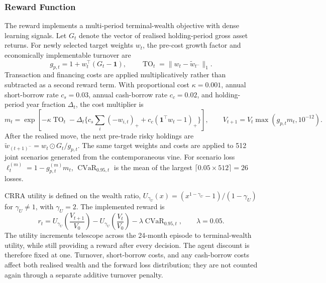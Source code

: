 \subsubsection{Reward Function}
\label{subsubsec:3_reward_function}

The reward implements a multi-period terminal-wealth objective with dense learning signals. Let $G_t$ denote the vector of realised holding-period gross asset returns. For newly selected target weights $w_t$, the pre-cost growth factor and economically implementable turnover are
%
\begin{equation}
g_{p,t}=1+w_t^{\top}(G_t-\mathbf{1}),
\qquad \operatorname{TO}_t=\lVert w_t-\widetilde w_{t^-}\rVert_1.
\label{eq:portfolio_return}
\end{equation}
%
Transaction and financing costs are applied multiplicatively rather than subtracted as a second reward term. With proportional cost $\kappa=0.001$, annual short-borrow rate $c_s=0.03$, annual cash-borrow rate $c_c=0.02$, and holding-period year fraction $\Delta_t$, the cost multiplier is
%
\begin{equation}
m_t=\exp\left[-\kappa\operatorname{TO}_t-\Delta_t\{c_s\sum_i(-w_{i,t})_+ + c_c(\mathbf{1}^{\top}w_t-1)_+\}\right],
\qquad V_{t+1}=V_t\max(g_{p,t}m_t,10^{-12}).
\label{eq:cost_adjusted_wealth}
\end{equation}
%
After the realised move, the next pre-trade risky holdings are $\widetilde w_{(t+1)^-}=w_t\odot G_t/g_{p,t}$. The same target weights and costs are applied to 512 joint scenarios generated from the contemporaneous vine. For scenario loss $\ell_t^{(m)}=1-g_{p,t}^{(m)}m_t$, $\operatorname{CVaR}_{0.95,t}$ is the mean of the largest $\lceil0.05\times512\rceil=26$ losses.

CRRA utility is defined on the wealth ratio, $U_{\gamma_U}(x)=(x^{1-\gamma_U}-1)/(1-\gamma_U)$ for $\gamma_U\neq1$, with $\gamma_U=2$. The implemented reward is
%
\begin{equation}
r_t=U_{\gamma_U}\!\left(\frac{V_{t+1}}{V_0}\right)-U_{\gamma_U}\!\left(\frac{V_t}{V_0}\right)-\lambda\operatorname{CVaR}_{0.95,t},
\qquad \lambda=0.05.
\label{eq:reward_function}
\end{equation}
%
The utility increments telescope across the 24-month episode to terminal-wealth utility, while still providing a reward after every decision. The agent discount is therefore fixed at one. Turnover, short-borrow costs, and any cash-borrow costs affect both realised wealth and the forward loss distribution; they are not counted again through a separate additive turnover penalty.









